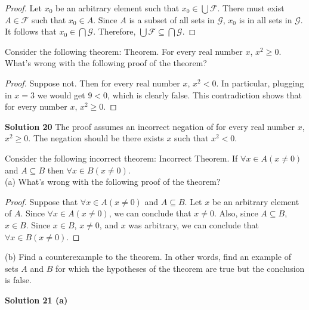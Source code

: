 \begin{proof}
    Let $x_0$ be an arbitrary element such that $x_0 \in \bigcup \mathcal{F}$.
    There must exist $A \in \mathcal{F}$ such that $x_0 \in A$.
    Since $A$ is a subset of all sets in $\mathcal{G}$,
    $x_0$ is in all sets in $\mathcal{G}$. It follows that $x_0 \in \bigcap \mathcal{G}$.
    Therefore, $\bigcup \mathcal{F} \subseteq  \bigcap \mathcal{G}$.
\end{proof}

\begin{tcolorbox}[title=Problem 20, breakable]
    Consider the following theorem:
    Theorem. For every real number $x$, $x^2 \ge 0$.
    What’s wrong with the following proof of the
    theorem?
    \begin{proof}
        Suppose not. Then for every real number $x$,
        $x^2 < 0$. In particular, plugging in $x = 3$ we would get
        $9 < 0$, which is clearly false. This contradiction
        shows that for every number $x$, $x^2 \ge 0$.
    \end{proof}
\end{tcolorbox}

\textbf{Solution 20}
The proof assumes an incorrect negation of for every real number $x$, $x^2 \ge 0$.
The negation should be there exists $x$ such that $x^2 < 0$.

\begin{tcolorbox}[title=Problem 21, breakable]
    Consider the following incorrect theorem:
    Incorrect Theorem. If $\forall{x} \in  A(x \not =  0)$ and $A \subseteq  B$
    then $\forall{x} \in  B(x \not =  0)$. \\
    (a) What’s wrong with the following proof of the
    theorem?
    \begin{proof}
        Suppose that $\forall{x} \in  A(x \not =  0)$ and $A \subseteq  B$. Let $x$
        be an arbitrary element of $A$. Since $\forall{x} \in  A(x \not =  0)$,
        we can conclude that $x \not =  0$. Also, since $A \subseteq  B$, $x \in
            B$. Since $x \in  B$, $x \not =  0$, and $x$ was arbitrary, we can
        conclude that $\forall{x} \in  B(x \not =  0)$.
    \end{proof}
    (b) Find a counterexample to the theorem. In other
    words, find an example of sets $A$ and $B$ for which
    the hypotheses of the theorem are true but the
    conclusion is false.
\end{tcolorbox}

\textbf{Solution 21 (a)}


